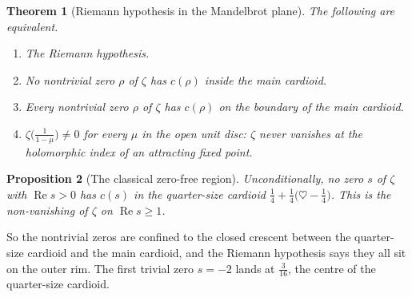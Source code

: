 \documentclass[11pt,a4paper]{article}
\newtheorem{theorem}{Theorem}
\newtheorem{proposition}[theorem]{Proposition}
\theoremstyle{remark}\newtheorem*{remark}{Remark}
\renewcommand{\Re}{\operatorname{Re}}
\begin{document}
\begin{theorem}[Riemann hypothesis in the Mandelbrot plane]\label{rh}
The following are equivalent.
\begin{enumerate}[label=(\alph*)]
  \item The Riemann hypothesis.
  \item No nontrivial zero $\rho$ of $\zeta$ has $c(\rho)$ inside the main cardioid.
  \item Every nontrivial zero $\rho$ of $\zeta$ has $c(\rho)$ on the boundary of the main cardioid.
  \item $\zeta\bigl(\tfrac1{1-\mu}\bigr)\neq0$ for every $\mu$ in the open unit disc: $\zeta$
        never vanishes at the holomorphic index of an attracting fixed point.
\end{enumerate}
\end{theorem}

\begin{proposition}[The classical zero-free region]\label{quarter}
Unconditionally, no zero $s$ of $\zeta$ with $\Re s>0$ has $c(s)$ in the quarter-size
cardioid $\tfrac14+\tfrac14\bigl(\heartsuit-\tfrac14\bigr)$. This is the non-vanishing
of $\zeta$ on $\Re s\ge1$.
\end{proposition}

So the nontrivial zeros are confined to the closed crescent between the quarter-size
cardioid and the main cardioid, and the Riemann hypothesis says they all sit on the
outer rim. The first trivial zero $s=-2$ lands at $\tfrac3{16}$, the centre of the
quarter-size cardioid.
\end{document}
